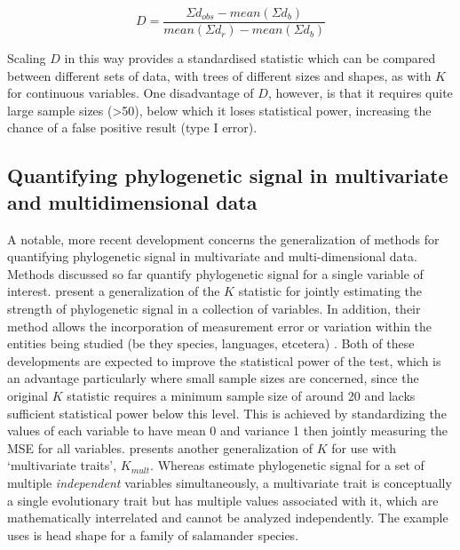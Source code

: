 \begin{equation}
D = \frac{\Sigma d_{obs} - mean\left( \Sigma d_{b} \right)}{mean\left( \Sigma d_{r} \right) - mean\left( \Sigma d_{b} \right)}
\end{equation}

Scaling \(D\) in this way provides a standardised statistic which can be compared between different sets of data, with trees of different sizes and shapes, as with \(K\) for continuous variables. One disadvantage of \(D\), however, is that it requires quite large sample sizes (\textgreater{}50), below which it loses statistical power, increasing the chance of a false positive result (type I error).

\hypertarget{phylo-sig-mult}{%
\subsection{Quantifying phylogenetic signal in multivariate and multidimensional data}\label{phylo-sig-mult}}

A notable, more recent development concerns the generalization of methods for quantifying phylogenetic signal in multivariate and multi-dimensional data. Methods discussed so far quantify phylogenetic signal for a single variable of interest. \textcite{zheng_new_2009} present a generalization of the \textcite{blomberg_testing_2003} \(K\) statistic for jointly estimating the strength of phylogenetic signal in a collection of variables. In addition, their method allows the incorporation of measurement error or variation within the entities being studied (be they species, languages, etcetera) \autocite[see][]{ives_within-species_2007}. Both of these developments are expected to improve the statistical power of the test, which is an advantage particularly where small sample sizes are concerned, since the original \(K\) statistic requires a minimum sample size of around 20 and lacks sufficient statistical power below this level. This is achieved by standardizing the values of each variable to have mean 0 and variance 1 then jointly measuring the MSE for all variables. \textcite{adams_generalized_2014} presents another generalization of \(K\) for use with `multivariate traits', \(K_{mult}\). Whereas \textcite{zheng_new_2009} estimate phylogenetic signal for a set of multiple \emph{independent} variables simultaneously, a multivariate trait is conceptually a single evolutionary trait but has multiple values associated with it, which are mathematically interrelated and cannot be analyzed independently. The example \textcite{adams_generalized_2014} uses is head shape for a family of salamander species.

